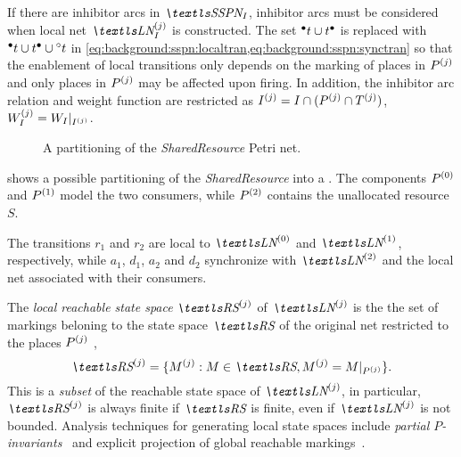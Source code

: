 If there are inhibitor arcs in $\SSPN_I$, inhibitor arcs must be
considered when local net $\LNI{j}$ is constructed. The set
$\prescript{\bullet}{}{t} \cup t^\bullet$ is replaced with
$\prescript{\bullet}{}{t} \cup t^\bullet \cup \prescript{\circ}{}{t}$ in
\cref{eq:background:sspn:localtran,eq:background:sspn:synctran} so
that the enablement of local transitions only depends on the marking
of places in $P^{(j)}$ and only places in $P^{(j)}$ may be
affected upon firing. In addition, the inhibitor arc relation and
weight function are restricted as
$I^{(j)} = I \cap (P^{(j)} \cap T^{(j)})$,
$W_I^{(j)} = W_I |_{I^{(j)}}$.

\begin{figure}
  \centering
  \caption{A partitioning of the \emph{SharedResource} Petri net.}
  \label{fig:background:sspn:sharedresource}
\end{figure}

\begin{runningExample}
   shows a possible
  partitioning of the \emph{Shared\-Resource}  into a
  . The components $P^{(0)}$ and $P^{(1)}$ model
  the two consumers, while $P^{(2)}$ contains the unallocated
  resource $S$.

  The transitions $r_1$ and $r_2$ are local to $\LN{0}$ and $\LN{1}$,
  respectively, while $a_1$, $d_1$, $a_2$ and $d_2$ synchronize with
  $\LN{2}$ and the local net associated with their consumers.
\end{runningExample}

The \emph{local reachable state space} $\loc{\RS}{j}$ of $\LN{j}$ is
the the set of markings beloning to the state space $\RS$ of the
original net restricted to the places $P^{(j)}$ ,
\begin{equation}
  \loc{\RS}{j} = \{ \loc{M}{j} : M \in \RS, \loc{M}{j} = M
  |_{\loc{P}{j}} \}.
\end{equation}
This is a \emph{subset} of the reachable state space of $\LN{j}$, in
particular, $\loc{\RS}{j}$ is always finite if $\RS$ is finite, even if
$\LN{j}$ is not bounded. Analysis techniques for generating local
state spaces include \emph{partial
  $P$-invariants}~\citep{DBLP:journals/sigmetrics/BuchholzK98} and
explicit projection of global reachable
markings~\citep{DBLP:journals/tse/Buchholz99}.

